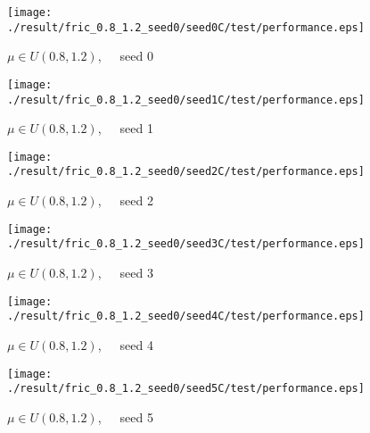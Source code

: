 \begin{figure}[p]
 \begin{minipage}{0.49\hsize}
  \begin{center}
 \texttt{[image: ./result/fric\_0.8\_1.2\_seed0/seed0C/test/performance.eps]}
  \caption{$\mu\in U(0.8,1.2)$,~~~seed 0
  }
  \end{center}
 \end{minipage}
 \begin{minipage}{0.49\hsize}
   \begin{center}
 \texttt{[image: ./result/fric\_0.8\_1.2\_seed0/seed1C/test/performance.eps]}
  \caption{$\mu\in U(0.8,1.2)$,~~~seed 1
  }
  \end{center}
 \end{minipage}
\end{figure}

\begin{figure}[p]
 \begin{minipage}{0.49\hsize}
  \begin{center}
 \texttt{[image: ./result/fric\_0.8\_1.2\_seed0/seed2C/test/performance.eps]}
  \caption{$\mu\in U(0.8,1.2)$,~~~seed 2
  }
  \end{center}
 \end{minipage}
 \begin{minipage}{0.49\hsize}
   \begin{center}
 \texttt{[image: ./result/fric\_0.8\_1.2\_seed0/seed3C/test/performance.eps]}
  \caption{$\mu\in U(0.8,1.2)$,~~~seed 3
  }
  \end{center}
 \end{minipage}
\end{figure}

\begin{figure}[p]
 \begin{minipage}{0.49\hsize}
  \begin{center}
 \texttt{[image: ./result/fric\_0.8\_1.2\_seed0/seed4C/test/performance.eps]}
  \caption{$\mu\in U(0.8,1.2)$,~~~seed 4
  }
  \end{center}
 \end{minipage}
 \begin{minipage}{0.49\hsize}
   \begin{center}
 \texttt{[image: ./result/fric\_0.8\_1.2\_seed0/seed5C/test/performance.eps]}
  \caption{$\mu\in U(0.8,1.2)$,~~~seed 5
  }
  \end{center}
 \end{minipage}
\end{figure}
